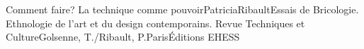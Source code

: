 Comment faire? La technique comme pouvoirPatriciaRibaultEssais de Bricologie. Ethnologie de l’art et du design contemporains. Revue Techniques et CultureGolsenne, T./Ribault, P.ParisÉditions EHESS